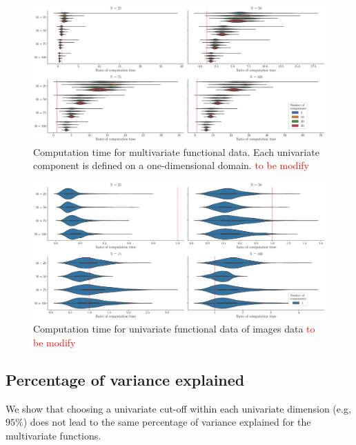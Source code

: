 \begin{figure}
    \centering
    \includegraphics[scale=0.25]{figures/computation_time_pall.eps}
    \caption{Computation time for multivariate functional data. Each univariate component is defined on a one-dimensional domain. \textcolor{red}{to be modify}}
    \label{fig:computation_time_mfd_1d}
\end{figure}

\begin{figure}
    \centering
    \includegraphics[scale=0.25]{figures/computation_time_p1.eps}
    \caption{Computation time for univariate functional data of images data \textcolor{red}{to be modify}}
    \label{fig:computation_time_fd_2d}
\end{figure}




\subsection{Percentage of variance explained} %
\label{sub:percentage_of_variance_explained}

We show that choosing a univariate cut-off within each univariate dimension (e.g, $95\%$) does not lead to the same percentage of variance explained for the multivariate functions.

